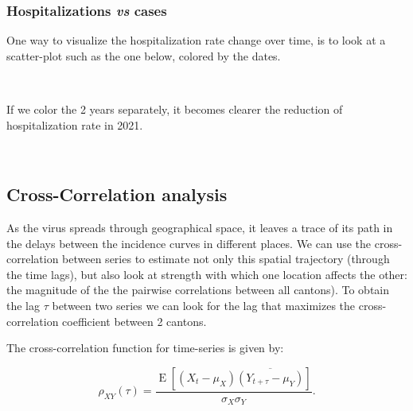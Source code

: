 \documentclass[11pt]{article}
\begin{document}
    \hypertarget{hospitalizations-vs-cases}{%
\subsubsection{\texorpdfstring{Hospitalizations \emph{vs}
cases}{Hospitalizations vs cases}}\label{hospitalizations-vs-cases}}

One way to visualize the hospitalization rate change over time, is to
look at a scatter-plot such as the one below, colored by the dates.

    \begin{center}
    \end{center}
    { \hspace*{\fill} \\}
    
    If we color the 2 years separately, it becomes clearer the reduction of
hospitalization rate in 2021.

    \begin{center}
    \end{center}
    { \hspace*{\fill} \\}
    
    \hypertarget{cross-correlation-analysis}{%
\subsection{Cross-Correlation analysis}\label{s:cross-correlation-analysis}}

As the virus spreads through geographical space, it leaves a trace of
its path in the delays between the incidence curves in different places.
We can use the cross-correlation between series to estimate not only
this spatial trajectory (through the time lags), but also look at
strength with which one location affects the other: the magnitude of the
the pairwise correlations between all cantons). To obtain the lag
\(\tau\) between two series we can look for the lag that maximizes the
cross-correlation coefficient between 2 cantons.

The cross-correlation function for time-series is given by:

\[\rho_{XY}(\tau)={\frac {\operatorname{E} \left[\left(X_{t}-\mu _{X}\right){\overline {\left(Y_{t+\tau }-\mu _{Y}\right)}}\right]}{\sigma _{X}\sigma _{Y}}}.\]
\end{document}
